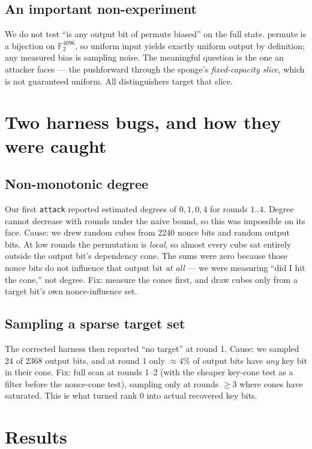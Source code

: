 \documentclass[11pt,a4paper]{article}
\theoremstyle{plain}
\theoremstyle{definition}
\theoremstyle{remark}
\newcommand{\FF}{\mathbb{F}}
\begin{document}
\subsection{An important non-experiment}

We do not test ``is any output bit of $\mathrm{permute}$ biased'' on the full state.
$\mathrm{permute}$ is a bijection on $\FF_2^{4096}$, so uniform input yields exactly
uniform output by definition; any measured bias is sampling noise. The meaningful
question is the one an attacker faces --- the pushforward through the sponge's
\emph{fixed-capacity slice}, which is not guaranteed uniform. All distinguishers
target that slice.

\section{Two harness bugs, and how they were caught}
\label{sec:harnessbugs}

\subsection{Non-monotonic degree}

Our first \texttt{attack} reported estimated degrees of $0, 1, 0, 4$ for rounds
$1..4$. Degree cannot decrease with rounds under the naive bound, so this was
impossible on its face. Cause: we drew random cubes from 2240 nonce bits and random
output bits. At low rounds the permutation is \emph{local}, so almost every cube sat
entirely outside the output bit's dependency cone. The sums were zero because those
nonce bits do not influence that output bit \emph{at all} --- we were measuring ``did I
hit the cone,'' not degree. Fix: measure the cones first, and draw cubes only from a
target bit's own nonce-influence set.

\subsection{Sampling a sparse target set}

The corrected harness then reported ``no target'' at round 1. Cause: we sampled 24
of 2368 output bits, and at round 1 only $\approx 4\%$ of output bits have \emph{any}
key bit in their cone. Fix: full scan at rounds 1--2 (with the cheaper key-cone test
as a filter before the nonce-cone test), sampling only at rounds $\ge 3$ where cones
have saturated. This is what turned rank 0 into actual recovered key bits.

\section{Results}
\label{sec:results}
\end{document}

